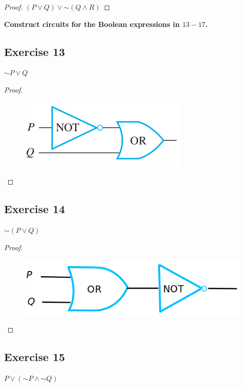 \documentclass[14pt]{extarticle}
\begin{document}
\begin{proof} 
$(P \vee Q) \vee {\sim (Q \wedge R)}$ 
\end{proof}

{\bf \color{cyan} Construct circuits for the Boolean expressions in $13-17$.}

\subsection{Exercise 13} 
${\sim P} \vee Q$

\begin{proof} 
\begin{figure}[ht!] 
\centering
\includegraphics[scale=0.5]{../images/2.4.13.png} 
\end{figure} 
\end{proof}

\subsection{Exercise 14} 
${\sim(P \vee Q)}$

\begin{proof} 
\begin{figure}[ht!] 
\centering
\includegraphics[scale=0.3]{../images/2.4.14.png} 
\end{figure} 
\end{proof}

\subsection{Exercise 15} 
$P \vee ({\sim P} \wedge {\sim Q})$
\end{document}
